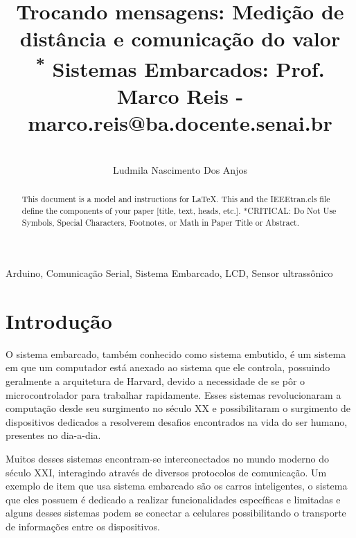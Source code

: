 \documentclass[conference]{IEEEtran}
\begin{document}
\title{Trocando mensagens: Medição de distância e comunicação do valor\\
{\footnotesize \textsuperscript{*} Sistemas Embarcados: Prof. Marco Reis - marco.reis@ba.docente.senai.br}
}


\author{
    \IEEEauthorblockN\centerline{}{Ludmila Nascimento Dos Anjos}
    \and
}
\maketitle

\begin{abstract}
    This document is a model and instructions for \LaTeX.
    This and the IEEEtran.cls file define the components of your paper [title, text, heads, etc.]. *CRITICAL: Do Not Use Symbols, Special Characters, Footnotes,
    or Math in Paper Title or Abstract.
\end{abstract}

\begin{IEEEkeywords}
    Arduino, Comunicação Serial, Sistema Embarcado, LCD, Sensor ultrassônico
\end{IEEEkeywords}

\section{Introdução}

O sistema embarcado, também conhecido como sistema embutido, é um sistema em que um computador está anexado ao sistema que ele controla, possuindo geralmente a arquitetura de Harvard, devido a necessidade de se pôr o microcontrolador para trabalhar rapidamente. 
Esses sistemas revolucionaram a computação desde seu surgimento no século XX e possibilitaram o surgimento de dispositivos dedicados a resolverem desafios encontrados na vida do ser humano, presentes no dia-a-dia.

Muitos desses sistemas encontram-se interconectados no mundo moderno do século XXI, interagindo através de diversos protocolos de comunicação. Um exemplo de item que usa sistema embarcado são os carros inteligentes, 
o sistema que eles possuem é dedicado a realizar funcionalidades específicas e limitadas e alguns desses sistemas podem se conectar a celulares possibilitando o transporte de informações entre os dispositivos. 
\end{document}

